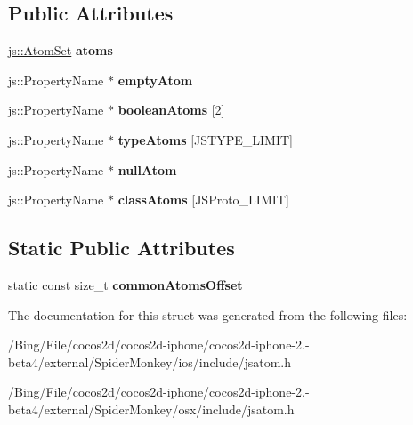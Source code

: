 \subsection*{Public Attributes}
\begin{DoxyCompactItemize}
\item 
\hypertarget{struct_j_s_atom_state_af2d5b4213e46b7dfbd3e20643d0dd40f}{\hyperlink{classjs_1_1_hash_set}{js\-::\-Atom\-Set} {\bfseries atoms}}\label{struct_j_s_atom_state_af2d5b4213e46b7dfbd3e20643d0dd40f}

\item 
\hypertarget{struct_j_s_atom_state_a3e7e6f85ec1c3bf9c437da6f0812eb12}{js\-::\-Property\-Name $\ast$ {\bfseries empty\-Atom}}\label{struct_j_s_atom_state_a3e7e6f85ec1c3bf9c437da6f0812eb12}

\item 
\hypertarget{struct_j_s_atom_state_ab6a1a9f7176bdadbd432822e0aaf507d}{js\-::\-Property\-Name $\ast$ {\bfseries boolean\-Atoms} \mbox{[}2\mbox{]}}\label{struct_j_s_atom_state_ab6a1a9f7176bdadbd432822e0aaf507d}

\item 
\hypertarget{struct_j_s_atom_state_a1e8087ddf479214df7c914a4000090dc}{js\-::\-Property\-Name $\ast$ {\bfseries type\-Atoms} \mbox{[}J\-S\-T\-Y\-P\-E\-\_\-\-L\-I\-M\-I\-T\mbox{]}}\label{struct_j_s_atom_state_a1e8087ddf479214df7c914a4000090dc}

\item 
\hypertarget{struct_j_s_atom_state_a3ca7fafb7d5dc062cad6cc07d49fc1c3}{js\-::\-Property\-Name $\ast$ {\bfseries null\-Atom}}\label{struct_j_s_atom_state_a3ca7fafb7d5dc062cad6cc07d49fc1c3}

\item 
\hypertarget{struct_j_s_atom_state_abd957f80b88a54036c074cd6c05cfca0}{js\-::\-Property\-Name $\ast$ {\bfseries class\-Atoms} \mbox{[}J\-S\-Proto\-\_\-\-L\-I\-M\-I\-T\mbox{]}}\label{struct_j_s_atom_state_abd957f80b88a54036c074cd6c05cfca0}

\end{DoxyCompactItemize}
\subsection*{Static Public Attributes}
\begin{DoxyCompactItemize}
\item 
\hypertarget{struct_j_s_atom_state_adc91161eb2a949957db17bf1a0383548}{static const size\-\_\-t {\bfseries common\-Atoms\-Offset}}\label{struct_j_s_atom_state_adc91161eb2a949957db17bf1a0383548}

\end{DoxyCompactItemize}


The documentation for this struct was generated from the following files\-:\begin{DoxyCompactItemize}
\item 
/\-Bing/\-File/cocos2d/cocos2d-\/iphone/cocos2d-\/iphone-\/2.-\/beta4/external/\-Spider\-Monkey/ios/include/jsatom.\-h\item 
/\-Bing/\-File/cocos2d/cocos2d-\/iphone/cocos2d-\/iphone-\/2.-\/beta4/external/\-Spider\-Monkey/osx/include/jsatom.\-h\end{DoxyCompactItemize}
